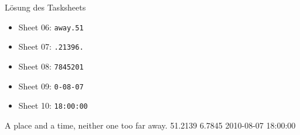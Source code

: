 \begin {frame}[<+->]{Lösung des Tasksheets}
	\begin{itemize}
	\item Sheet 06: \texttt{away.\textvisiblespace{}51}
	\item Sheet 07: \texttt{.2139\textvisiblespace{}6.}
	\item Sheet 08: \texttt{7845\textvisiblespace{}201}
	\item Sheet 09: \texttt{0-08-07\textvisiblespace{}}
	\item Sheet 10: \texttt{18:00:00}
	\end{itemize}
\end{frame}

\begin{frame}{A place and a time, neither one too far away.}
	\hfill 51.2139 6.7845 2010-08-07 18:00:00 \hfill\hbox{}
\end{frame}
